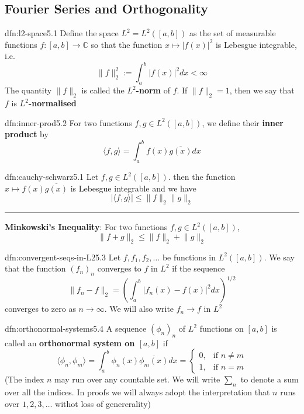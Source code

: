 \documentclass[landscape, 8pt]{extarticle}
\begin{document}
\begin{multicols}{3}
\newpage
\section{Fourier Series and Orthogonality}

\begin{dfn}{dfn:l2-space}{5.1}
	Define the space $L^{2} = L^{2}([a, b])$ as the set of measurable functions $f : [a, b] \to \mathbb{C}$ so that the function $x \mapsto \lvert f(x) \rvert^{2}$ is Lebesgue integrable, i.e.
	\[\lVert f \rVert^{2}_{2} := \int_{a}^{b} \lvert f(x) \rvert^{2} dx < \infty\]
	The quantity $\lVert f \rVert_{2}$ is called the \textbf{$L^{2}$-norm} of $f$. If $\lVert f \rVert_{2} = 1$, then we say that $f$ is \textbf{$L^{2}$-normalised}
\end{dfn}

\begin{dfn}{dfn:inner-prod}{5.2}
	For two functions $f, g\in L^{2}([a,b])$, we define their \textbf{inner product} by
	\[\langle f, g \rangle = \int_{a}^{b} f(x)\overline{g(x)} dx\]
\end{dfn}

\begin{thm}{dfn:cauchy-schwarz}{5.1}
	Let $f, g\in L^{2}([a, b])$. then the function $x \mapsto f(x)\overline{g(x)}$ is Lebesgue integrable and we have
	\[\lvert \langle f, g \rangle \rvert \le \lVert f \rVert_{2} \lVert g \rVert_{2}\]

	\noindent\rule{\textwidth}{0.2pt}
	\textbf{Minkowski's Inequality}: For two functions $f, g\in L^{2}([a, b])$,
	\[\lVert f + g \rVert_{2} \le \lVert f \rVert_{2} + \lVert g \rVert_{2}\]
\end{thm}

\begin{dfn}{dfn:convergent-seqs-in-L2}{5.3}
	Let $f,f_{1},f_{2},\dots$ be functions in $L^{2}([a, b])$. We say that the function $(f_{n})_{n}$ converges to $f$ in $L^{2}$ if the sequence
	\[\lVert f_{n} - f \rVert_{2} = \left(\int_{a}^{b} \lvert f_{n}(x) - f(x) \rvert^{2} dx\right)^{1 /2}\]
	converges to zero as $n \to \infty$. We will also write $f_{n} \to f$ in $L^{2}$
\end{dfn}

\begin{dfn}{dfn:orthonormal-systems}{5.4}
	A sequence $(\phi_{n})_{n}$ of $L^{2}$ functions on $[a, b]$ is called an \textbf{orthonormal system on $[a, b]$} if
	\[\langle \phi_{n}, \phi_{m} \rangle = \int_{a}^{b} \phi_{n}(x)\overline{\phi_{m}(x)} dx = \begin{cases}
		0, & \text{if $n \ne m$} \\
		1, & \text{if $n = m$}
	\end{cases}\]
	(The index $n$ may run over any countable set. We will write $\sum_{n}$ to denote a sum over all the indices. In proofs we will always adopt the interpretation that $n$ runs over $1,2,3,\dots$ withot loss of genererality)
\end{dfn}


\end{multicols}
\end{document}
